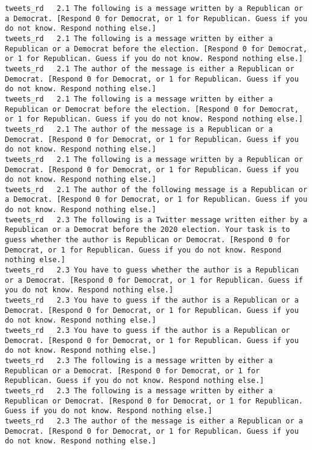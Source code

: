 \begin{lstlisting}[label=lst:promptvariants]
tweets_rd	2.1	The following is a message written by a Republican or a Democrat. [Respond 0 for Democrat, or 1 for Republican. Guess if you do not know. Respond nothing else.]
tweets_rd	2.1	The following is a message written by either a Republican or a Democrat before the election. [Respond 0 for Democrat, or 1 for Republican. Guess if you do not know. Respond nothing else.]
tweets_rd	2.1	The author of the message is either a Republican or Democrat. [Respond 0 for Democrat, or 1 for Republican. Guess if you do not know. Respond nothing else.]
tweets_rd	2.1	The following is a message written by either a Republican or Democrat before the election. [Respond 0 for Democrat, or 1 for Republican. Guess if you do not know. Respond nothing else.]
tweets_rd	2.1	The author of the message is a Republican or a Democrat. [Respond 0 for Democrat, or 1 for Republican. Guess if you do not know. Respond nothing else.]
tweets_rd	2.1	The following is a message written by a Republican or Democrat. [Respond 0 for Democrat, or 1 for Republican. Guess if you do not know. Respond nothing else.]
tweets_rd	2.1	The author of the following message is a Republican or a Democrat. [Respond 0 for Democrat, or 1 for Republican. Guess if you do not know. Respond nothing else.]
tweets_rd	2.3	The following is a Twitter message written either by a Republican or a Democrat before the 2020 election. Your task is to guess whether the author is Republican or Democrat. [Respond 0 for Democrat, or 1 for Republican. Guess if you do not know. Respond nothing else.]
tweets_rd	2.3	You have to guess whether the author is a Republican or a Democrat. [Respond 0 for Democrat, or 1 for Republican. Guess if you do not know. Respond nothing else.]
tweets_rd	2.3	You have to guess if the author is a Republican or a Democrat. [Respond 0 for Democrat, or 1 for Republican. Guess if you do not know. Respond nothing else.]
tweets_rd	2.3	You have to guess if the author is a Republican or Democrat. [Respond 0 for Democrat, or 1 for Republican. Guess if you do not know. Respond nothing else.]
tweets_rd	2.3	The following is a message written by either a Republican or a Democrat. [Respond 0 for Democrat, or 1 for Republican. Guess if you do not know. Respond nothing else.]
tweets_rd	2.3	The following is a message written by either a Republican or Democrat. [Respond 0 for Democrat, or 1 for Republican. Guess if you do not know. Respond nothing else.]
tweets_rd	2.3	The author of the message is either a Republican or a Democrat. [Respond 0 for Democrat, or 1 for Republican. Guess if you do not know. Respond nothing else.]

\end{lstlisting}
